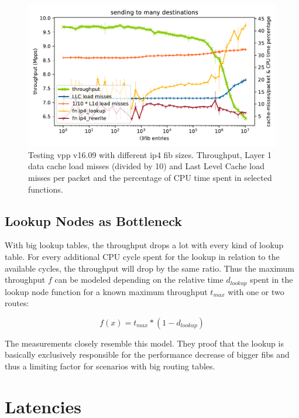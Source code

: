 \begin{figure}[!ht]
\noindent\hspace{0.5mm}\includegraphics[width=\linewidth]{pics/throughput_l3_routes_klaipeda_v1609_32ghz_v3.pdf}
\caption{Testing \Ac{vpp} v16.09 with different \Ac{ip4} \Ac{fib} sizes. Throughput, Layer 1 data cache load misses (divided by 10) and Last Level Cache load misses per packet and the percentage of CPU time spent in selected functions. }
\label{graph:ip4fiblegacy}
\end{figure}

\subsection{Lookup Nodes as Bottleneck}

With big lookup tables, the throughput drops a lot with every kind of
lookup table. For every additional CPU cycle spent for the
lookup in relation to the available cycles, the throughput will drop
by the same ratio. Thus the maximum throughput $f$ can be modeled
depending on the relative time $d_{lookup}$ spent in the lookup node
function for a known maximum throughput $t_{max}$ with one or two
routes:

$$ f(x) = t_{max} * ( 1 - d_{lookup} ) $$

The measurements closely resemble this model. They proof that the
lookup is basically exclusively responsible for the performance
decrease of bigger \Ac{fib}s and thus a limiting factor for scenarios with
big routing tables.









\section{Latencies}

